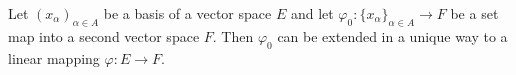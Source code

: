 Let $(x_{\alpha})_{\alpha \in A}$ be a basis of a vector space $E$ and let $\varphi_0: \{x_{\alpha}\}_{\alpha \in A} \rightarrow F$ be a set map into a second vector space $F$. Then $\varphi_0$ can be extended in a unique way to a linear mapping $\varphi: E \rightarrow F$.
